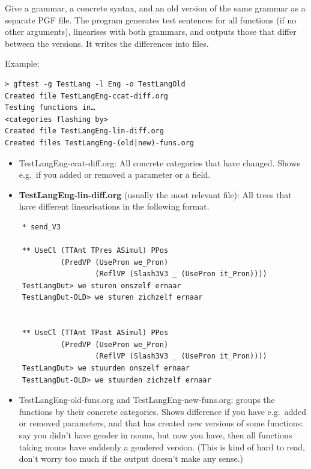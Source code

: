 Give a grammar, a concrete syntax, and an old version of the same
grammar as a separate PGF file. The program generates test sentences for
all functions (if no other arguments), linearises with both grammars,
and outputs those that differ between the versions. It writes the
differences into files.

Example:

\begin{verbatim}
> gftest -g TestLang -l Eng -o TestLangOld
Created file TestLangEng-ccat-diff.org
Testing functions in…
<categories flashing by>
Created file TestLangEng-lin-diff.org
Created files TestLangEng-(old|new)-funs.org
\end{verbatim}

\begin{itemize}
\item
  TestLangEng-ccat-diff.org: All concrete categories that have changed.
  Shows e.g.~if you added or removed a parameter or a field.
\item
  \textbf{TestLangEng-lin-diff.org} (usually the most relevant file):
  All trees that have different linearisations in the following format.
\end{itemize}

\begin{verbatim}
    * send_V3

    ** UseCl (TTAnt TPres ASimul) PPos
             (PredVP (UsePron we_Pron)
                     (ReflVP (Slash3V3 _ (UsePron it_Pron))))
    TestLangDut> we sturen onszelf ernaar
    TestLangDut-OLD> we sturen zichzelf ernaar


    ** UseCl (TTAnt TPast ASimul) PPos
             (PredVP (UsePron we_Pron)
                     (ReflVP (Slash3V3 _ (UsePron it_Pron))))
    TestLangDut> we stuurden onszelf ernaar
    TestLangDut-OLD> we stuurden zichzelf ernaar
\end{verbatim}

\begin{itemize}
\tightlist
\item
  TestLangEng-old-funs.org and TestLangEng-new-funs.org: groups the
  functions by their concrete categories. Shows difference if you have
  e.g.~added or removed parameters, and that has created new versions of
  some functions: say you didn't have gender in nouns, but now you have,
  then all functions taking nouns have suddenly a gendered version.
  (This is kind of hard to read, don't worry too much if the output
  doesn't make any sense.)
\end{itemize}

